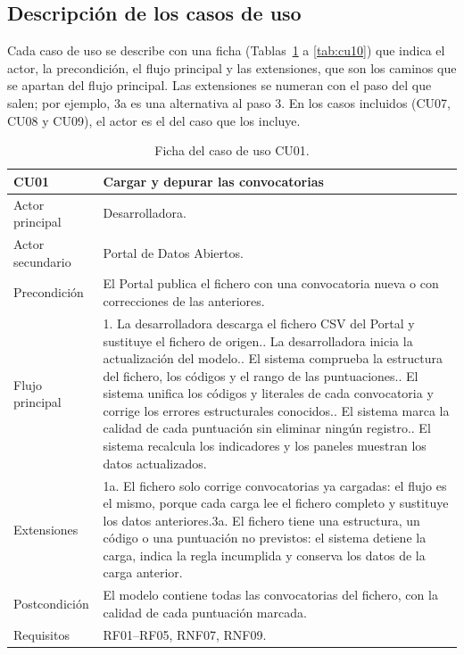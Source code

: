 \documentclass[12pt, a4paper, oneside]{report}
\begin{document}
\subsection{Descripción de los casos de uso}
Cada caso de uso se describe con una ficha (Tablas~\ref{tab:cu01} a \ref{tab:cu10}) que indica el actor, la precondición, el flujo principal y las extensiones, que son los caminos que se apartan del flujo principal. Las extensiones se numeran con el paso del que salen; por ejemplo, 3a es una alternativa al paso 3. En los casos incluidos (CU07, CU08 y CU09), el actor es el del caso que los incluye.

\begin{table}[H]
\centering
\small
{}\renewcommand{\arraystretch}{1.1}
\begin{tabularx}{\textwidth}{@{} >{\raggedright\arraybackslash}p{2.8cm} X @{}}
\toprule
\textbf{CU01} & \textbf{Cargar y depurar las convocatorias} \\ \midrule
Actor principal & Desarrolladora. \\ \addlinespace
Actor secundario & Portal de Datos Abiertos. \\ \addlinespace
Precondición & El Portal publica el fichero con una convocatoria nueva o con correcciones de las anteriores. \\ \addlinespace
Flujo principal & 1. La desarrolladora descarga el fichero CSV del Portal y sustituye el fichero de origen.\newline 2. La desarrolladora inicia la actualización del modelo.\newline 3. El sistema comprueba la estructura del fichero, los códigos y el rango de las puntuaciones.\newline 4. El sistema unifica los códigos y literales de cada convocatoria y corrige los errores estructurales conocidos.\newline 5. El sistema marca la calidad de cada puntuación sin eliminar ningún registro.\newline 6. El sistema recalcula los indicadores y los paneles muestran los datos actualizados. \\ \addlinespace
Extensiones & 1a. El fichero solo corrige convocatorias ya cargadas: el flujo es el mismo, porque cada carga lee el fichero completo y sustituye los datos anteriores.\newline 3a. El fichero tiene una estructura, un código o una puntuación no previstos: el sistema detiene la carga, indica la regla incumplida y conserva los datos de la carga anterior. \\ \addlinespace
Postcondición & El modelo contiene todas las convocatorias del fichero, con la calidad de cada puntuación marcada. \\ \addlinespace
Requisitos & RF01--RF05, RNF07, RNF09. \\ \bottomrule
\end{tabularx}
\caption{Ficha del caso de uso CU01.}
\label{tab:cu01}
\end{table}
\end{document}
